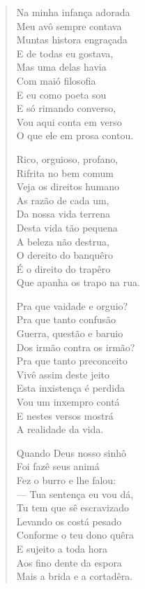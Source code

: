 \begin{verse}
Na minha infança adorada\\
Meu avô sempre contava\\
Muntas histora engraçada\\
E de todas eu gostava,\\
Mas uma delas havia\\
Com maió filosofia\\
E eu como poeta sou\\
E só rimando converso,\\
Vou aqui conta em verso\\
O que ele em prosa contou.

Rico, orguioso, profano,\\
Rifrita no bem comum\\
Veja os direitos humano\\
As razão de cada um,\\
Da nossa vida terrena\\
Desta vida tão pequena\\
A beleza não destrua,\\
O dereito do banquêro\\
É o direito do trapêro\\
Que apanha os trapo na rua.

Pra que vaidade e orguio?\\
Pra que tanto confusão\\
Guerra, questão e baruio\\
Dos irmão contra os irmão?\\
Pra que tanto preconceito\\
Vivê assim deste jeito\\
Esta inxistença é perdida\\
Vou um inxempro contá\\
E nestes versos mostrá\\
A realidade da vida.

Quando Deus nosso sinhô\\
Foi fazê seus animá\\
Fez o burro e lhe falou:\\
--- Tua sentença eu vou dá,\\
Tu tem que sê escravizado\\
Levando os costá pesado\\
Conforme o teu dono quêra\\
E sujeito a toda hora\\
Aos fino dente da espora\\
Mais a brida e a cortadêra.


\end{verse}
